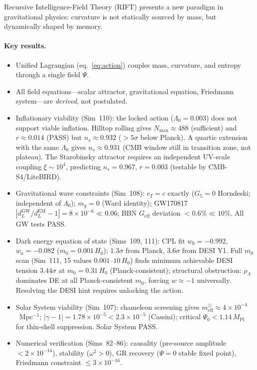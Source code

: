 \documentclass[12pt,a4paper]{article}
\begin{document}
Recursive Intelligence-Field Theory (RIFT) presents a new paradigm in gravitational
physics: curvature is not statically sourced by mass, but dynamically shaped by memory.

\paragraph{Key results.}
\begin{itemize}
  \item Unified Lagrangian (eq.~\eqref{eq:action}) couples mass, curvature, and entropy through a single field $\Psi$.
  \item All field equations---scalar attractor, gravitational equation, Friedmann system---are \emph{derived}, not postulated.
  \item Inflationary viability (Sim~110): the locked action ($\Lambda_0=0.003$) does not support viable inflation.  Hilltop rolling gives $N_\mathrm{max}\approx488$ (sufficient) and $r\approx0.014$ (PASS) but $n_s\approx0.932$ ($>5\sigma$ below Planck).  A quartic extension with the same $\Lambda_0$ gives $n_s\approx0.931$ (CMB window still in transition zone, not plateau).  The Starobinsky attractor requires an independent UV-scale coupling $\xi\sim10^4$, predicting $n_s=0.967$, $r=0.003$ (testable by CMB-S4/LiteBIRD).
  \item Gravitational wave constraints (Sim~108): $c_T=c$ exactly ($G_5=0$ Horndeski; independent of $\Lambda_0$); $m_g=0$ (Ward identity); GW170817 $|d_L^\mathrm{GW}/d_L^\mathrm{EM}-1|=8\times10^{-6}\ll0.06$; BBN $G_\mathrm{eff}$ deviation $<0.6\%\ll10\%$.  All GW tests PASS.
  \item Dark energy equation of state (Sims~109, 111): CPL fit $w_0=-0.992$, $w_a=-0.082$ ($m_0=0.001\,H_0$); $1.3\sigma$ from Planck, $3.6\sigma$ from DESI Y1.  Full $m_0$ scan (Sim~111, 15 values $0.001$--$10\,H_0$) finds minimum achievable DESI tension $3.44\sigma$ at $m_0=0.31\,H_0$ (Planck-consistent); structural obstruction: $\rho_\Lambda$ dominates DE at all Planck-consistent $m_0$, forcing $w\approx-1$ universally.  Resolving the DESI hint requires unlocking the action.
  \item Solar System viability (Sim~107): chameleon screening gives $m_\mathrm{eff}^\odot\approx4\times10^{-4}$~Mpc$^{-1}$; $|\gamma-1|=1.78\times10^{-5}<2.3\times10^{-5}$ (Cassini); critical $\Psi_0<1.14\,M_\mathrm{Pl}$ for thin-shell suppression.  Solar System PASS.
  \item Numerical verification (Sims~82--86): causality (pre-source amplitude $< 2\times 10^{-14}$), stability ($\omega^2 > 0$), GR recovery ($\Psi = 0$ stable fixed point), Friedmann constraint $\leq 3 \times 10^{-16}$.

\end{itemize}
\end{document}
